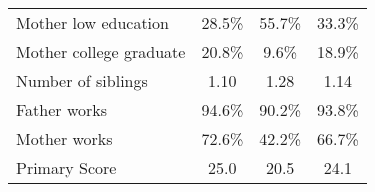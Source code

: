 \documentclass{article}
\begin{document}
\begin{table}[!ht]
\begin{center}
\begin{tabular}{l*{3}{c}}
Mother low education &       28.5\% &       55.7\% &       33.3\%\\
Mother college graduate &       20.8\% &       9.6\% &       18.9\%\\
Number of siblings &       1.10 &       1.28 &       1.14 \\
Father works &       94.6\% &       90.2\% &       93.8\%\\
Mother works &       72.6\% &       42.2\% &       66.7\%\\
Primary Score &      25.0 &      20.5 &      24.1\\

\end{tabular}
\end{center}
\end{table}
\end{document}
